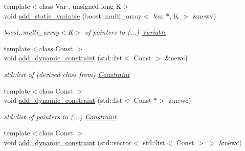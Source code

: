 \begin{Indent}
\begin{DoxyCompactItemize}
\mbox{\label{class_s_m_spp__di__unipi__it_1_1_block_a3ae23a7b1d7dd93449c0058357b5bdce}} 
{\footnotesize template$<$class Var , unsigned long K$>$ }\\void \mbox{\hyperlink{class_s_m_spp__di__unipi__it_1_1_block_a3ae23a7b1d7dd93449c0058357b5bdce}{add\+\_\+static\+\_\+variable}} (boost\+::multi\+\_\+array$<$ Var $\ast$, K $>$ \&newv)
\begin{DoxyCompactList}\small\item\em boost\+::multi\+\_\+array$<$\+K$>$ of pointers to (...) \mbox{\hyperlink{class_s_m_spp__di__unipi__it_1_1_variable}{Variable}} \end{DoxyCompactList}\item 
\mbox{\label{class_s_m_spp__di__unipi__it_1_1_block_af8871ad704bc4e8f3109a26103bfb3ff}} 
{\footnotesize template$<$class Const $>$ }\\void \mbox{\hyperlink{class_s_m_spp__di__unipi__it_1_1_block_af8871ad704bc4e8f3109a26103bfb3ff}{add\+\_\+dynamic\+\_\+constraint}} (std\+::list$<$ Const $>$ \&newc)
\begin{DoxyCompactList}\small\item\em std\+::list of (derived class from) \mbox{\hyperlink{class_s_m_spp__di__unipi__it_1_1_constraint}{Constraint}} \end{DoxyCompactList}\item 
\mbox{\label{class_s_m_spp__di__unipi__it_1_1_block_a3ebcbdfbe41128e261a6f37c858d5560}} 
{\footnotesize template$<$class Const $>$ }\\void \mbox{\hyperlink{class_s_m_spp__di__unipi__it_1_1_block_a3ebcbdfbe41128e261a6f37c858d5560}{add\+\_\+dynamic\+\_\+constraint}} (std\+::list$<$ Const $\ast$$>$ \&newc)
\begin{DoxyCompactList}\small\item\em std\+::list of pointers to (...) \mbox{\hyperlink{class_s_m_spp__di__unipi__it_1_1_constraint}{Constraint}} \end{DoxyCompactList}\item 
\mbox{\label{class_s_m_spp__di__unipi__it_1_1_block_a9218d5af1e79eeee812f2599edd43891}} 
{\footnotesize template$<$class Const $>$ }\\void \mbox{\hyperlink{class_s_m_spp__di__unipi__it_1_1_block_a9218d5af1e79eeee812f2599edd43891}{add\+\_\+dynamic\+\_\+constraint}} (std\+::vector$<$ std\+::list$<$ Const $>$ $>$ \&newc)
$$
\end{DoxyCompactItemize}
\end{Indent}
